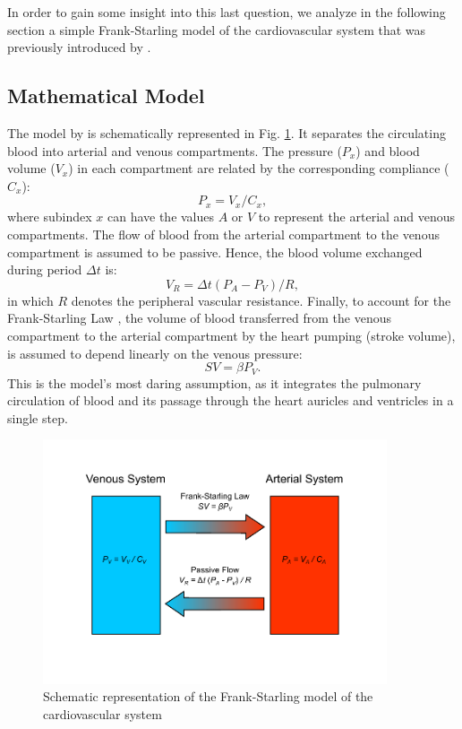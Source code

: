 \documentclass[%
preprint,
 amsmath,amssymb,
 aps,
]{revtex4-2}
\begin{document}
In order to gain some insight into this last question, we analyze in the following section a simple Frank-Starling model of the cardiovascular system that was previously introduced by \citet{Upton_2005}.

\subsection{Mathematical Model}

The model by \citeauthor{Upton_2005} is schematically represented in Fig. \ref{fig:model}. It separates the circulating blood into arterial and venous compartments. The pressure ($P_x$) and blood volume ($V_x$) in each compartment are related by the corresponding compliance ($C_x$):
\[
    P_x = V_x / C_x,
\] 
where subindex $x$ can have the values $A$ or $V$ to represent the arterial and venous compartments. The flow of blood from the arterial compartment to the venous compartment is assumed to be passive. Hence, the blood volume exchanged during period $\Delta t$ is:
\[
    V_R = \Delta t (P_A - P_V) / R,
\]
in which $R$ denotes the peripheral vascular resistance. Finally, to account for the Frank-Starling Law \citep{Jacob_1992}, the volume of blood transferred from the venous compartment to the arterial compartment by the heart pumping (stroke volume), is assumed to depend linearly on the venous pressure:
\[
    SV = \beta P_V.
\]
This is the model's most daring assumption, as it integrates the pulmonary circulation of blood and its passage through the heart auricles and ventricles in a single step.

\begin{figure}
\includegraphics[width=4in]{model.pdf}
\caption{Schematic representation of the Frank-Starling model of the cardiovascular system}
\label{fig:model}
\end{figure}
\end{document}
